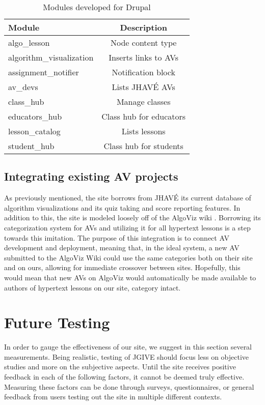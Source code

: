 \documentclass{acm_proc_article-sp}
\begin{document}
\begin{table}[h]
\begin{center}
\begin{tabular}{|l|c|}
\hline
\bf{Module} & \bf{Description} \\ \hline
algo\_lesson & Node content type \\
algorithm\_visualization & Inserts links to AVs \\
assignment\_notifier & Notification block \\
av\_devs &  Lists JHAV\'{E} AVs \\
class\_hub & Manage classes \\
educators\_hub & Class hub for educators \\
lesson\_catalog & Lists lessons \\
student\_hub & Class hub for students \\
\hline
\end{tabular}
\end{center}
\caption{Modules developed for Drupal}
\label{tbl:Modules developed for Drupal}
\end{table}

\subsection{Integrating existing AV projects}
As previously mentioned, the site borrows from JHAV\'{E} its current database of algorithm visualizations and its quiz taking and score reporting features. In addition to this, the site is modeled loosely off of the AlgoViz wiki \cite{algoviz}. Borrowing its categorization system for AVs and utilizing it for all hypertext lessons is a step towards this imitation. The purpose of this integration is to connect AV development and deployment, meaning that, in the ideal system, a new AV submitted to the AlgoViz Wiki could use the same categories both on their site and on ours, allowing for immediate crossover between sites. Hopefully, this would mean that new AVs on AlgoViz would automatically be made available to authors of hypertext lessons on our site, category intact.

\section{Future Testing}
\label{Future Testing}
In order to gauge the effectiveness of our site, we suggest in this section several measurements. Being realistic, testing of JGIVE should focus less on objective studies and more on the subjective aspects. Until the site receives positive feedback in each of the following factors, it cannot be deemed truly effective. Measuring these factors can be done through surveys, questionnaires, or general feedback from users testing out the site in multiple different contexts.
\end{document}

